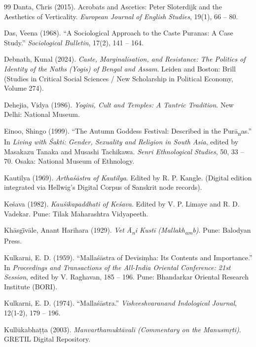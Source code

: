 \documentclass[11pt,twoside,letterpaper]{article}
\begin{document}
\begin{thebibliography}{99}
Danta, Chris (2015). Acrobats and Ascetics: Peter Sloterdijk and the Aesthetics of Verticality. \textit{European Journal of English Studies}, 19(1), 66 -- 80.

Das, Veena (1968). ``A Sociological Approach to the Caste Puranas: A Case Study.'' \textit{Sociological Bulletin}, 17(2), 141 -- 164.

Debnath, Kunal (2024). \textit{Caste, Marginalisation, and Resistance: The Politics of Identity of the Naths (Yogis) of Bengal and Assam}. Leiden and Boston: Brill (Studies in Critical Social Sciences / New Scholarship in Political Economy, Volume 274).

Dehejia, Vidya (1986). \textit{Yoginī, Cult and Temples: A Tantric Tradition}. New Delhi: National Museum.

Einoo, Shingo (1999). ``The Autumn Goddess Festival: Described in the Purā\textsubscript{n}as.'' In \textit{Living with Śakti: Gender, Sexuality and Religion in South Asia}, edited by Masakazu Tanaka and Musashi Tachikawa. \textit{Senri Ethnological Studies}, 50, 33 -- 70. Osaka: National Museum of Ethnology.

Kautilya (1969). \textit{Arthaśāstra of Kautilya}. Edited by R. P. Kangle. (Digital edition integrated via Hellwig's Digital Corpus of Sanskrit node records).

Keśava (1982). \textit{Kauśikapaddhati of Keśava}. Edited by V. P. Limaye and R. D. Vadekar. Pune: Tilak Maharashtra Vidyapeeth.

Khāsg\={ī}vāle, Anant Harihara (1929). \textit{Vet Ā\textsubscript{n}i Kustī (Mallakh\textsubscript{a}\textsubscript{m}b)}. Pune: Balodyan Press.

Kulkarni, E. D. (1959). ``Mallaśāstra of Devīsiṃha: Its Contents and Importance.'' In \textit{Proceedings and Transactions of the All-India Oriental Conference: 21st Session}, edited by V. Raghavan, 185 -- 196. Pune: Bhandarkar Oriental Research Institute (BORI).

Kulkarni, E. D. (1974). ``Mallaśāstra.'' \textit{Vishveshvaranand Indological Journal}, 12(1-2), 179 -- 196.

Kullūkabhaṭṭa (2003). \textit{Manvarthamuktāvalī (Commentary on the Manusmṛti)}. GRETIL Digital Repository.


\end{thebibliography}
\end{document}
